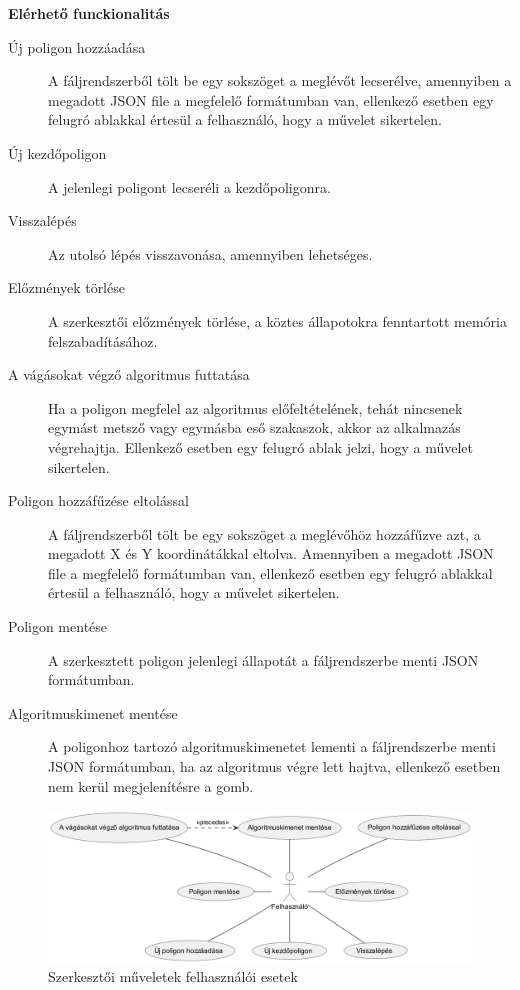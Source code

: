\textbf{Elérhető funckionalitás}

\begin{description}
    \item[Új poligon hozzáadása] A fáljrendszerből tölt be egy sokszöget a meglévőt lecserélve, amennyiben a megadott JSON file a megfelelő formátumban van, ellenkező esetben egy felugró ablakkal értesül a felhasználó, hogy a művelet sikertelen.
    \item[Új kezdőpoligon] A jelenlegi poligont lecseréli a kezdőpoligonra.
    \item[Visszalépés] Az utolsó lépés visszavonása, amennyiben lehetséges.
    \item[Előzmények törlése] A szerkesztői előzmények törlése, a köztes állapotokra fenntartott memória felszabadításához.
    \item[A vágásokat végző algoritmus futtatása] Ha a poligon megfelel az algoritmus előfeltételének, tehát nincsenek egymást metsző vagy egymásba eső szakaszok, akkor az alkalmazás végrehajtja. Ellenkező esetben egy felugró ablak jelzi, hogy a művelet sikertelen.
    \item[Poligon hozzáfűzése eltolással] A fáljrendszerből tölt be egy sokszöget a meglévőhöz hozzáfűzve azt, a megadott X és Y koordinátákkal eltolva. Amennyiben a megadott JSON file a megfelelő formátumban van, ellenkező esetben egy felugró ablakkal értesül a felhasználó, hogy a művelet sikertelen.
    \item[Poligon mentése] A szerkesztett poligon jelenlegi állapotát a fáljrendszerbe menti JSON formátumban.
    \item[Algoritmuskimenet mentése] A poligonhoz tartozó algoritmuskimenetet lementi a fáljrendszerbe menti JSON formátumban, ha az algoritmus végre lett hajtva, ellenkező esetben nem kerül megjelenítésre a gomb.
\end{description}

\begin{figure}[H]
    \centering
    \includegraphics[width=1\linewidth]{images/usecase_editor_actions.png}
    \caption{Szerkesztői műveletek felhasználói esetek}
    \label{fig:usecase_editor_actions-1}
\end{figure}

